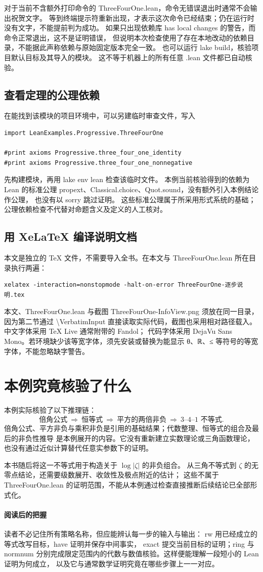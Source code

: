 \documentclass[UTF8,fontset=fandol,a4paper,11pt]{ctexart}
\newcommand{\code}[1]{{\small\ttfamily\def\_{\textunderscore\allowbreak}#1}}
\newcommand{\step}[1]{\Needspace{7\baselineskip}\subsection{#1}}
\begin{document}
对于当前不含额外打印命令的 \code{ThreeFourOne.lean}，命令无错误退出时通常不会输出祝贺文字。
等到终端提示符重新出现，才表示这次命令已经结束；仍在运行时没有文字，不能提前判为成功。
如果只出现依赖库 \code{has local changes} 的警告，而命令正常退出，这不是证明错误，
但说明本次检查使用了存在本地改动的依赖目录，不能据此声称依赖与原始固定版本完全一致。
也可以运行 \code{lake build}，核验项目默认目标及其导入的模块。
这不等于机器上的所有任意 \code{.lean} 文件都已自动核验。

\step{查看定理的公理依赖}
在能找到该模块的项目环境中，可以另建临时审查文件，写入
\begin{Verbatim}
import LeanExamples.Progressive.ThreeFourOne

#print axioms Progressive.three_four_one_identity
#print axioms Progressive.three_four_one_nonnegative
\end{Verbatim}
先构建模块，再用 \code{lake env lean} 检查该临时文件。
本例当前核验得到的依赖为 Lean 的标准公理
\code{propext}、\code{Classical.choice}、\code{Quot.sound}，没有额外引入本例结论作公理，
也没有以 \code{sorry} 跳过证明。
这些标准公理属于所采用形式系统的基础；公理依赖检查不代替对命题含义及定义的人工核对。

\step{用 XeLaTeX 编译说明文档}
本文是独立的 TeX 文件，不需要导入全书。在本文与 \code{ThreeFourOne.lean} 所在目录执行两遍：
\begin{Verbatim}
xelatex -interaction=nonstopmode -halt-on-error ThreeFourOne-逐步说明.tex
\end{Verbatim}
本文、\code{ThreeFourOne.lean} 与截图 \code{ThreeFourOne-InfoView.png}
须放在同一目录，因为第二节通过 \code{\textbackslash VerbatimInput}
直接读取实际代码，截图也采用相对路径载入。中文字体采用 TeX Live 通常附带的 Fandol；
代码字体采用 DejaVu Sans Mono。若环境缺少该等宽字体，须先安装或替换为能显示
\code{θ}、\code{ℝ}、\code{≤} 等符号的等宽字体，不能忽略缺字警告。

\section{本例究竟核验了什么}

本例实际核验了以下推理链：
\[
  \text{倍角公式}
  \ \Longrightarrow\ 
  \text{恒等式}
  \ \Longrightarrow\ 
  \text{平方的两倍非负}
  \ \Longrightarrow\ 
  \text{3--4--1 不等式}.
\]
倍角公式、平方非负与乘积非负是引用的基础结果；代数整理、恒等式的组合及最后的非负性推导
是本例展开的内容。它没有重新建立实数理论或三角函数理论，也没有通过近似计算替代任意实参数下的证明。

本书随后将这一不等式用于构造关于 $\log|\zeta|$ 的非负组合。
从三角不等式到 $\zeta$ 的无零点结论，还需要级数展开、收敛性及极点附近的估计；
这些不属于 \code{ThreeFourOne.lean} 的证明范围，不能从本例通过检查直接推断后续结论已全部形式化。

\paragraph{阅读后的把握}
读者不必记住所有策略名称，但应能辨认每一步的输入与输出：
\code{rw} 用已经成立的等式改写目标，\code{have} 证明并保存中间事实，
\code{exact} 提交当前目标的证明；\code{ring} 与 \code{norm\_num}
分别完成限定范围内的代数与数值核验。这样便能理解一段短小的 Lean 证明为何成立，
以及它与通常数学证明究竟在哪些步骤上一一对应。
\end{document}
